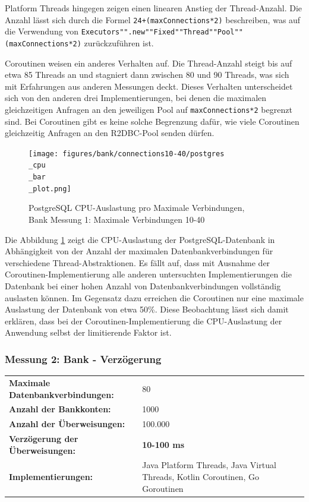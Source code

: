 \documentclass[fontsize=12pt,paper=a4,twoside=semi,parskip=half-,headsepline,headinclude]{scrreprt}
\begin{document}
Platform Threads hingegen zeigen einen linearen Anstieg der Thread-Anzahl. Die Anzahl lässt sich durch die Formel \texttt{24+(maxConnections*2)} beschreiben, was auf die Verwendung von \texttt{Executors"".new""Fixed""Thread""Pool""(maxConnections*2)} zurückzuführen ist.

Coroutinen weisen ein anderes Verhalten auf. Die Thread-Anzahl steigt bis auf etwa 85 Threads an und stagniert dann zwischen 80 und 90 Threads, was sich mit Erfahrungen aus anderen Messungen deckt. Dieses Verhalten unterscheidet sich von den anderen drei Implementierungen, bei denen die maximalen gleichzeitigen Anfragen an den jeweiligen Pool auf \texttt{maxConnections*2} begrenzt sind. Bei Coroutinen gibt es keine solche Begrenzung dafür, wie viele Coroutinen gleichzeitig Anfragen an den R2DBC-Pool senden dürfen.

\begin{figure}[H]
	\centering
	\texttt{[image: figures/bank/connections10-40/postgres\\\_cpu\\\_bar\\\_plot.png]}
	\caption{PostgreSQL CPU-Auslastung pro Maximale Verbindungen,\\ Bank Messung 1: Maximale Verbindungen 10-40}
	\label{fig:bankConnPostgCPU}
\end{figure}

Die Abbildung \ref{fig:bankConnPostgCPU} zeigt die CPU-Auslastung der PostgreSQL-Datenbank in Abhängigkeit von der Anzahl der maximalen Datenbankverbindungen für verschiedene Thread-Abstrak\-tionen. Es fällt auf, dass mit Ausnahme der Coroutinen-Implementierung alle anderen untersuchten Implementierungen die Datenbank bei einer hohen Anzahl von Datenbankverbindungen vollständig auslasten können. Im Gegensatz dazu erreichen die Coroutinen nur eine maximale Auslastung der Datenbank von etwa 50\%. Diese Beobachtung lässt sich damit erklären, dass bei der Coroutinen-Implementierung die CPU-Auslastung der Anwendung selbst der limitierende Faktor ist.

\subsubsection{Messung 2: Bank - Verzögerung}

\begin{tabularx}{\textwidth}{@{}lX@{}}
	\textbf{Maximale Datenbankverbindungen:} & 80 \\
	\textbf{Anzahl der Bankkonten:} & 1000 \\
	\textbf{Anzahl der Überweisungen:} & 100.000 \\
	\textbf{Verzögerung der Überweisungen:} & \textbf{10-100 ms} \\
	\textbf{Implementierungen:} & Java Platform Threads, Java Virtual Threads, Kotlin Coroutinen, Go Goroutinen
\end{tabularx}
\end{document}
